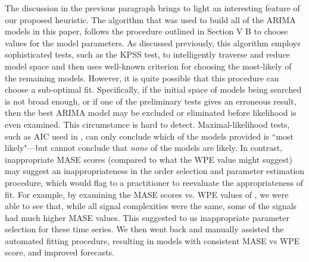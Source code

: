 The discussion in the previous paragraph brings to light an interesting feature of our proposed heuristic. The \arima algorithm that was used to build all of the ARIMA
models in this paper, follows the procedure outlined
in Section V B to choose values for the model parameters.
As discussed previously, this algorithm employs sophisticated tests, such as the KPSS test, to intelligently traverse and reduce model space and then uses well-known criterion for choosing the most-likely of the remaining models. However, it is quite possible that this procedure can choose a sub-optimal fit. Specifically, if the initial space of models being searched is not broad enough, or if one of the preliminary tests gives an erroneous result, then the best ARIMA model may be excluded or eliminated before likelihood is even examined. This circumstance is hard to detect. Maximal-likelihood  tests, such as AIC used in \arima, can only conclude which of the models provided is ``most likely"---but cannot conclude that \emph{none} of the models are likely. In contrast,
inappropriate MASE scores (compared to
what the WPE value might suggest) may suggest an inappropriateness in the order selection and parameter estimation procedure, which would flag to a practitioner to reevaluate the appropriateness of fit. For example,
by examining the \arima MASE scores vs. WPE values of \col, we were able to see that, while all signal complexities were the same, some of the signals had much higher MASE values. This suggested to us inappropriate parameter selection for these time series. We then went back and manually assisted the automated fitting procedure, resulting in models with consistent MASE vs WPE score, and improved forecasts.















